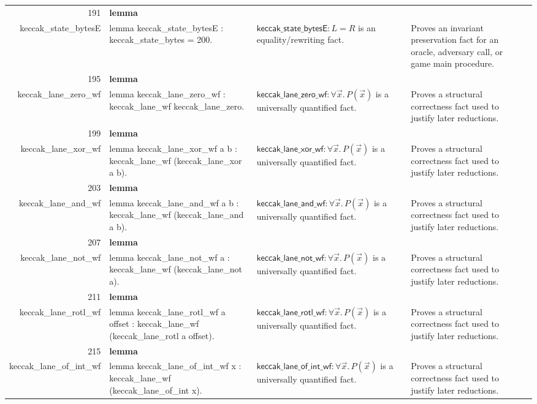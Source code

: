 \documentclass[10pt]{article}
\newcommand{\ec}[1]{\begingroup\ttfamily\scriptsize #1\endgroup}
\begin{document}
\begin{longtable}{r L{0.17\textwidth} L{0.26\textwidth} L{0.27\textwidth} L{0.20\textwidth}}
191 & \textbf{lemma}\\\ec{keccak\_state\_bytesE} & \ec{lemma keccak\_state\_bytesE : keccak\_state\_bytes = 200.} & \(\mathsf{keccak\_state\_bytesE} : L = R\) is an equality/rewriting fact. & Proves an invariant preservation fact for an oracle, adversary call, or game main procedure. \\
195 & \textbf{lemma}\\\ec{keccak\_lane\_zero\_wf} & \ec{lemma keccak\_lane\_zero\_wf : keccak\_lane\_wf keccak\_lane\_zero.} & \(\mathsf{keccak\_lane\_zero\_wf} : \forall \vec{x}.\, P(\vec{x})\) is a universally quantified fact. & Proves a structural correctness fact used to justify later reductions. \\
199 & \textbf{lemma}\\\ec{keccak\_lane\_xor\_wf} & \ec{lemma keccak\_lane\_xor\_wf a b : keccak\_lane\_wf (keccak\_lane\_xor a b).} & \(\mathsf{keccak\_lane\_xor\_wf} : \forall \vec{x}.\, P(\vec{x})\) is a universally quantified fact. & Proves a structural correctness fact used to justify later reductions. \\
203 & \textbf{lemma}\\\ec{keccak\_lane\_and\_wf} & \ec{lemma keccak\_lane\_and\_wf a b : keccak\_lane\_wf (keccak\_lane\_and a b).} & \(\mathsf{keccak\_lane\_and\_wf} : \forall \vec{x}.\, P(\vec{x})\) is a universally quantified fact. & Proves a structural correctness fact used to justify later reductions. \\
207 & \textbf{lemma}\\\ec{keccak\_lane\_not\_wf} & \ec{lemma keccak\_lane\_not\_wf a : keccak\_lane\_wf (keccak\_lane\_not a).} & \(\mathsf{keccak\_lane\_not\_wf} : \forall \vec{x}.\, P(\vec{x})\) is a universally quantified fact. & Proves a structural correctness fact used to justify later reductions. \\
211 & \textbf{lemma}\\\ec{keccak\_lane\_rotl\_wf} & \ec{lemma keccak\_lane\_rotl\_wf a offset : keccak\_lane\_wf (keccak\_lane\_rotl a offset).} & \(\mathsf{keccak\_lane\_rotl\_wf} : \forall \vec{x}.\, P(\vec{x})\) is a universally quantified fact. & Proves a structural correctness fact used to justify later reductions. \\
215 & \textbf{lemma}\\\ec{keccak\_lane\_of\_int\_wf} & \ec{lemma keccak\_lane\_of\_int\_wf x : keccak\_lane\_wf (keccak\_lane\_of\_int x).} & \(\mathsf{keccak\_lane\_of\_int\_wf} : \forall \vec{x}.\, P(\vec{x})\) is a universally quantified fact. & Proves a structural correctness fact used to justify later reductions. \\

\end{longtable}
\end{document}
